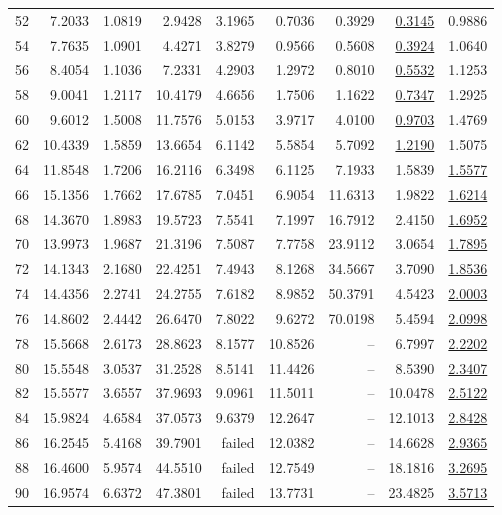 \documentclass{ucalgthes1}
\theoremstyle{definition}
\begin{document}
\begin{table}[htb]
\begin{tabular}{| r | r | r | r | r | r | r | r | r |}
52 & 7.2033 & 1.0819 & 2.9428 & 3.1965 & 0.7036 & 0.3929 & \underline{0.3145} & 0.9886 \\
54 & 7.7635 & 1.0901 & 4.4271 & 3.8279 & 0.9566 & 0.5608 & \underline{0.3924} & 1.0640 \\
56 & 8.4054 & 1.1036 & 7.2331 & 4.2903 & 1.2972 & 0.8010 & \underline{0.5532} & 1.1253 \\
58 & 9.0041 & 1.2117 & 10.4179 & 4.6656 & 1.7506 & 1.1622 & \underline{0.7347} & 1.2925 \\
60 & 9.6012 & 1.5008 & 11.7576 & 5.0153 & 3.9717 & 4.0100 & \underline{0.9703} & 1.4769 \\
62 & 10.4339 & 1.5859 & 13.6654 & 6.1142 & 5.5854 & 5.7092 & \underline{1.2190} & 1.5075 \\
64 & 11.8548 & 1.7206 & 16.2116 & 6.3498 & 6.1125 & 7.1933 & 1.5839 & \underline{1.5577} \\
66 & 15.1356 & 1.7662 & 17.6785 & 7.0451 & 6.9054 & 11.6313 & 1.9822 & \underline{1.6214} \\
68 & 14.3670 & 1.8983 & 19.5723 & 7.5541 & 7.1997 & 16.7912 & 2.4150 & \underline{1.6952} \\
70 & 13.9973 & 1.9687 & 21.3196 & 7.5087 & 7.7758 & 23.9112 & 3.0654 & \underline{1.7895} \\
72 & 14.1343 & 2.1680 & 22.4251 & 7.4943 & 8.1268 & 34.5667 & 3.7090 & \underline{1.8536} \\
74 & 14.4356 & 2.2741 & 24.2755 & 7.6182 & 8.9852 & 50.3791 & 4.5423 & \underline{2.0003} \\
76 & 14.8602 & 2.4442 & 26.6470 & 7.8022 & 9.6272 & 70.0198 & 5.4594 & \underline{2.0998} \\
78 & 15.5668 & 2.6173 & 28.8623 & 8.1577 & 10.8526 & -- & 6.7997 & \underline{2.2202} \\
80 & 15.5548 & 3.0537 & 31.2528 & 8.5141 & 11.4426 & -- & 8.5390 & \underline{2.3407} \\
82 & 15.5577 & 3.6557 & 37.9693 & 9.0961 & 11.5011 & -- & 10.0478 & \underline{2.5122} \\
84 & 15.9824 & 4.6584 & 37.0573 & 9.6379 & 12.2647 & -- & 12.1013 & \underline{2.8428} \\
86 & 16.2545 & 5.4168 & 39.7901 & failed & 12.0382 & -- & 14.6628 & \underline{2.9365} \\
88 & 16.4600 & 5.9574 & 44.5510 & failed & 12.7549 & -- & 18.1816 & \underline{3.2695} \\
90 & 16.9574 & 6.6372 & 47.3801 & failed & 13.7731 & -- & 23.4825 & \underline{3.5713} \\

\end{tabular}
\end{table}
\end{document}
